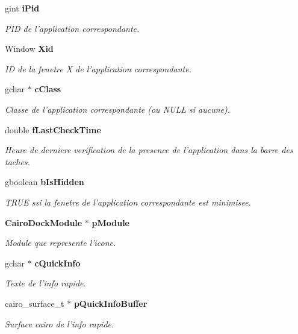 \begin{CompactItemize}
gint {\bf iPid}
\begin{CompactList}\small\item\em PID de l'application correspondante. \item\end{CompactList}\item 
Window {\bf Xid}
\begin{CompactList}\small\item\em ID de la fenetre X de l'application correspondante. \item\end{CompactList}\item 
gchar $\ast$ {\bf cClass}
\begin{CompactList}\small\item\em Classe de l'application correspondante (ou NULL si aucune). \item\end{CompactList}\item 
double {\bf fLastCheckTime}
\begin{CompactList}\small\item\em Heure de derniere verification de la presence de l'application dans la barre des taches. \item\end{CompactList}\item 
gboolean {\bf bIsHidden}
\begin{CompactList}\small\item\em TRUE ssi la fenetre de l'application correspondante est minimisee. \item\end{CompactList}\item 
{\bf CairoDockModule} $\ast$ {\bf pModule}
\begin{CompactList}\small\item\em Module que represente l'icone. \item\end{CompactList}\item 
gchar $\ast$ {\bf cQuickInfo}
\begin{CompactList}\small\item\em Texte de l'info rapide. \item\end{CompactList}\item 
cairo\_\-surface\_\-t $\ast$ {\bf pQuickInfoBuffer}
\begin{CompactList}\small\item\em Surface cairo de l'info rapide. \item\end{CompactList}\item 

\end{CompactItemize}
